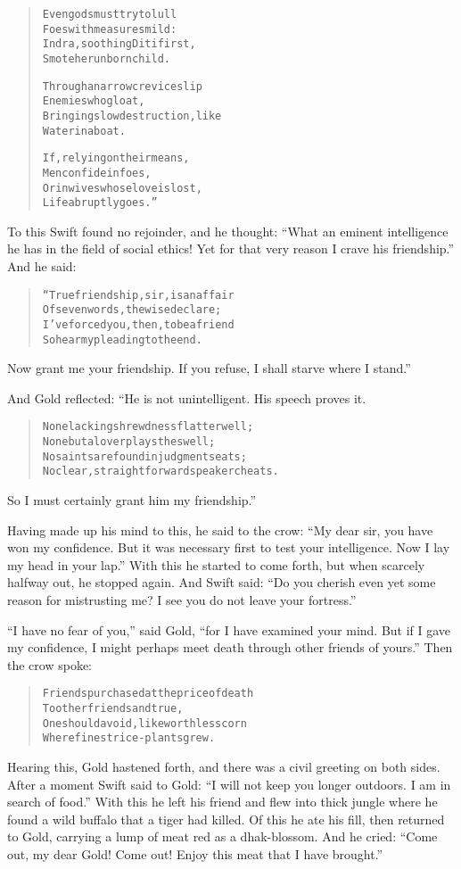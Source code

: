 \documentclass[article, twoside, 14pt]{memoir}
\renewenvironment{verbatim}{%
\begin{quote}%
\vskip -10pt%
\begin{alltt}\normalfont\large}{\end{alltt}%
\end{quote}%
\vskip -10pt
} %
\begin{document}
\begin{verbatim}
Even gods must try to lull
    Foes with measures mild:
Indra, soothing Diti first,
    Smote her unborn child.

Through a narrow crevice slip
    Enemies who gloat,
Bringing slow destruction, like
    Water in a boat.

If, relying on their means,
    Men confide in foes,
Or in wives whose love is lost,
    Life abruptly goes.”
\end{verbatim}
To this Swift found no rejoinder, and he thought:
``What an eminent intelligence he has in the field of social ethics! Yet for that very reason I crave his friendship.''
And he said:

\begin{verbatim}
“True friendship, sir, is an affair
Of seven words, the wise declare;
I've forced you, then, to be a friend{\textemdash}
So hear my pleading to the end.
\end{verbatim}
Now grant me your friendship. If you refuse, I shall starve where I
stand.”

And Gold reflected: “He is not unintelligent. His speech proves
it.

\begin{verbatim}
None lacking shrewdness flatter well;
None but a lover plays the swell;
No saints are found in judgment seats;
No clear, straightforward speaker cheats.
\end{verbatim}
So I must certainly grant him my friendship.”

Having made up his mind to this, he said to the crow:
``My dear sir, you have won my confidence. But it was necessary first to test your intelligence. Now I lay my head in your lap.''
With this he started to come forth, but when scarcely halfway out,
he stopped again. And Swift said:
``Do you cherish even yet some reason for mistrusting me? I see you do not leave your fortress.''

``I have no fear of you,'' said Gold,
``for I have examined your mind. But if I gave my confidence, I might perhaps meet death through other friends of yours.''
Then the crow spoke:

\begin{verbatim}
Friends purchased at the price of death
    To other friends and true,
One should avoid, like worthless corn
    Where finest rice-plants grew.
\end{verbatim}
Hearing this, Gold hastened forth, and there was a civil greeting
on both sides. After a moment Swift said to Gold:
``I will not keep you longer outdoors. I am in search of food.''
With this he left his friend and flew into thick jungle where he
found a wild buffalo that a tiger had killed. Of this he ate his
fill, then returned to Gold, carrying a lump of meat red as a
dhak-blossom. And he cried:
``Come out, my dear Gold! Come out! Enjoy this meat that I have brought.''
\end{document}
